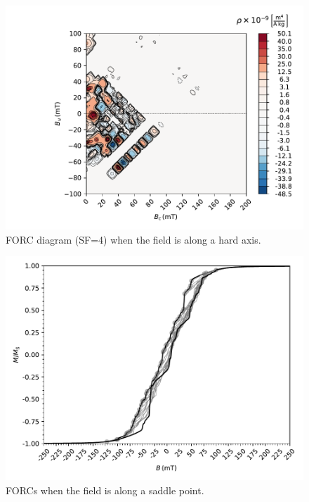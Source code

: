 \begin{figure}
\centering
\includegraphics[width=\textwidth]{research-4/figs/FORC_16_SF4.pdf}
\caption[FORC diagram when the field is along a hard axis]{FORC diagram (SF=4) when the field is along a hard axis.}
\label{FIG_05}
\end{figure}

\begin{figure}
\centering
\includegraphics[width=\textwidth]{research-4/figs/BM14_withFORCS.pdf}
\caption[FORCs when the field is along a saddle point]{FORCs when the field is along a saddle point.}
\label{FIG_06}
\end{figure}

